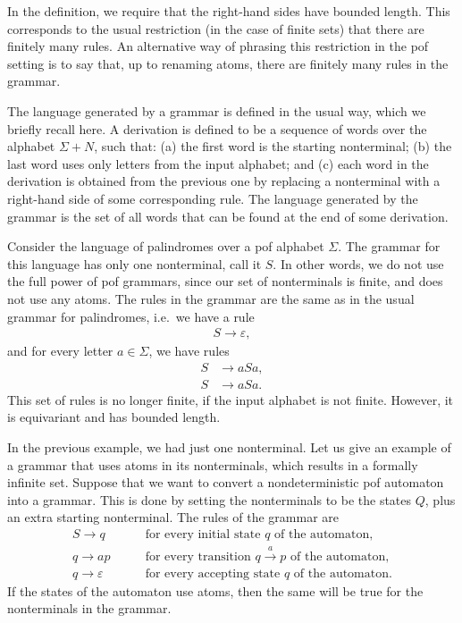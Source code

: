 In the definition, we require that the right-hand sides have bounded length. This corresponds to the usual restriction (in the case of finite sets) that there are finitely many rules. An alternative way of phrasing this restriction in the pof setting is to say that, up to renaming atoms, there are finitely many rules in the grammar. 

The language generated by a grammar  is defined in the usual way, which we briefly recall here. A derivation is defined  to be a sequence of words over the alphabet $\Sigma + N$, such that: (a) the first word is the starting nonterminal; (b) the last word uses only letters from the input alphabet; and (c) each word in the derivation is  obtained from the previous one by replacing a nonterminal  with a right-hand side of some corresponding rule. The language generated by the grammar is the set of all words that can be found at the end of some derivation.



\begin{myexample}
	 \label{example:palindrome-grammar}
	Consider the language of palindromes over a pof alphabet $\Sigma$. The grammar for this language has only one nonterminal, call it $S$. In other words, we do not use the full power of pof grammars, since  our set of nonterminals is finite, and does not use any atoms. The rules in the grammar are the same as in the usual grammar for palindromes, i.e.~we have a rule 
	\begin{align*}
	S \to \varepsilon,
	\end{align*}
	and for every letter $a \in \Sigma$, we have rules
	\begin{align*}
	S & \to aSa, \\
	S & \to aSa.
	\end{align*}
	This set of rules is no longer finite, if the input alphabet is not finite. However, it is equivariant and has bounded length. 
\end{myexample}

\begin{myexample} In the previous example, we had just one nonterminal. Let us give an example of a grammar that uses atoms in its nonterminals, which results in a formally infinite set. Suppose that we want to convert a nondeterministic pof automaton into a grammar. This is done by setting the nonterminals to be the states $Q$, plus an extra starting nonterminal. The rules of the grammar are 
	\begin{align*}
	S  \to q  \qquad & \text{for every initial state $q$ of the automaton},\\
	q  \to ap \qquad & \text{for every transition $q \stackrel a \to p$ of the automaton},\\
	q \to \varepsilon \qquad & \text{for every accepting state $q$ of the automaton}.
	\end{align*}
If the states of the automaton use atoms, then the same will be true for the nonterminals in the grammar.
\end{myexample}
	
